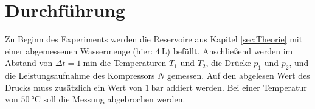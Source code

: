 \section{Durchführung} \label{sec:Durchführung}
    Zu Beginn des Experiments werden die Reservoire aus Kapitel \ref{sec:Theorie} mit einer abgemessenen Wassermenge (hier: $\SI{4}{\liter}$) befüllt.
    Anschließend werden im Abstand von $\Delta t = \SI{1}{\minute}$ die Temperaturen $T_1$ und $T_2$, die Drücke $p_1$ und $p_2$, und die Leistungsaufnahme des Kompressors $N$ gemessen.
    Auf den abgelesen Wert des Drucks muss zusätzlich ein Wert von $\SI{1}{\bar}$ addiert werden.
    Bei einer Temperatur von $\SI{50}{\celsius}$ soll die Messung abgebrochen werden.
